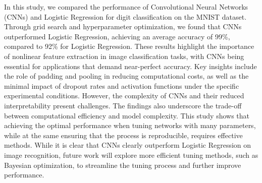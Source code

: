 In this study, we compared the performance of Convolutional Neural Networks (CNNs) and Logistic Regression for digit classification on the MNIST dataset. Through grid search and hyperparameter optimization, we found that CNNs outperformed Logistic Regression, achieving an average accuracy of 99\%, compared to 92\% for Logistic Regression. These results highlight the importance of nonlinear feature extraction in image classification tasks, with CNNs being essential for applications that demand near-perfect accuracy. Key insights include the role of padding and pooling in reducing computational costs, as well as the minimal impact of dropout rates and activation functions under the specific experimental conditions. However, the complexity of CNNs and their reduced interpretability present challenges. The findings also underscore the trade-off between computational efficiency and model complexity. This study shows that achieving the optimal performance when tuning networks with many parameters, while at the same ensuring that the process is reproducible, requires effective methods. While it is clear that CNNs clearly outperform Logistic Regression on image recognition, future work will explore more efficient tuning methods, such as Bayesian optimization, to streamline the tuning process and further improve performance.
